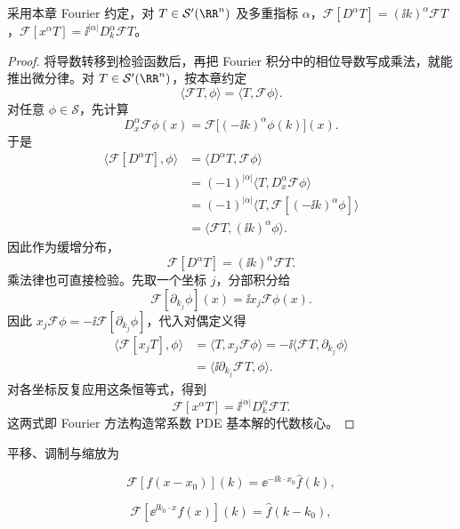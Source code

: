 \begin{proposition}
采用本章 Fourier 约定，对 $T\in\mathcal S'(\RR^n)$ 及多重指标 $\alpha$，$\mathcal F[D^\alpha T]=(\ii k)^\alpha\mathcal FT$，$\mathcal F[x^\alpha T]=\ii^{|\alpha|}D_k^\alpha\mathcal FT$。
\end{proposition}
\begin{proof}
将导数转移到检验函数后，再把 Fourier 积分中的相位导数写成乘法，就能推出微分律。对 $T\in\mathcal S'(\RR^n)$，按本章约定
\[
\langle\mathcal FT,\phi\rangle
=\langle T,\mathcal F\phi\rangle.
\]
对任意 $\phi\in\mathcal S$，先计算
\[
D_x^\alpha\mathcal F\phi(x)
=
\mathcal F\bigl[(-\ii k)^\alpha\phi(k)\bigr](x).
\]
于是
\[
\begin{aligned}
\langle\mathcal F[D^\alpha T],\phi\rangle
&=\langle D^\alpha T,\mathcal F\phi\rangle\\
&=(-1)^{|\alpha|}
\langle T,D_x^\alpha\mathcal F\phi\rangle\\
&=(-1)^{|\alpha|}
\langle T,\mathcal F[(-\ii k)^\alpha\phi]\rangle\\
&=\langle\mathcal FT,(\ii k)^\alpha\phi\rangle.
\end{aligned}
\]
因此作为缓增分布，
\begin{equation}
\mathcal F[D^\alpha T]
=(\ii k)^\alpha\mathcal FT.
\label{eq:tempered-fourier-derivative}
\end{equation}
乘法律也可直接检验。先取一个坐标 $j$，分部积分给
\[
\mathcal F[\partial_{k_j}\phi](x)=\ii x_j\mathcal F\phi(x).
\]
因此 $x_j\mathcal F\phi=-\ii\mathcal F[\partial_{k_j}\phi]$，代入对偶定义得
\[
\begin{aligned}
\langle\mathcal F[x_jT],\phi\rangle
&=\langle T,x_j\mathcal F\phi\rangle
=-\ii\langle\mathcal FT,\partial_{k_j}\phi\rangle\\
&=\langle\ii\partial_{k_j}\mathcal FT,\phi\rangle.
\end{aligned}
\]
对各坐标反复应用这条恒等式，得到
\begin{equation}
\mathcal F[x^\alpha T]
=\ii^{|\alpha|}D_k^\alpha\mathcal FT.
\label{eq:tempered-fourier-multiplication}
\end{equation}
这两式即 Fourier 方法构造常系数 PDE 基本解的代数核心。
\end{proof}

平移、调制与缩放为

\[
\mathcal F[f(x-x_0)](k)=\ee^{-\ii k\cdot x_0}\widehat f(k),
\]

\[
\mathcal F[\ee^{\ii k_0\cdot x}f(x)](k)=\widehat f(k-k_0),
\]

